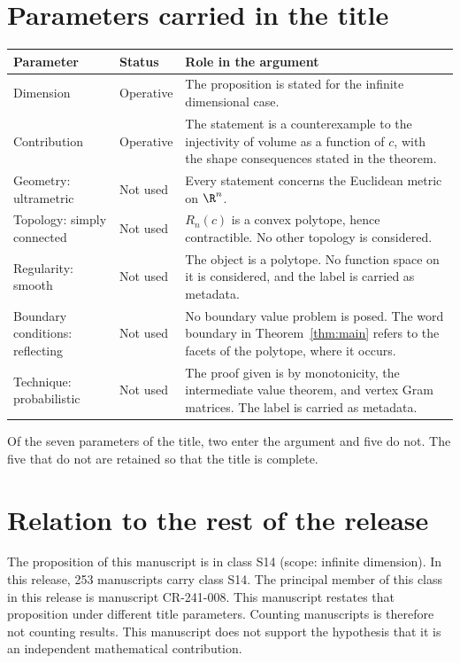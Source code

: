 \documentclass[11pt]{article}
\begin{document}
\section{Parameters carried in the title}\label{sec:params}
\begin{center}
\small
\begin{tabular}{p{}p{}p{}}
\toprule
Parameter & Status & Role in the argument \\
\midrule
Dimension & Operative & The proposition is stated for the infinite dimensional case. \\
Contribution & Operative & The statement is a counterexample to the injectivity of volume as a function of $c$, with the shape consequences stated in the theorem. \\
Geometry: ultrametric & Not used & Every statement concerns the Euclidean metric on $\R^n$. \\
Topology: simply connected & Not used & $R_n(c)$ is a convex polytope, hence contractible. No other topology is considered. \\
Regularity: smooth & Not used & The object is a polytope. No function space on it is considered, and the label is carried as metadata. \\
Boundary conditions: reflecting & Not used & No boundary value problem is posed. The word boundary in Theorem~\ref{thm:main} refers to the facets of the polytope, where it occurs. \\
Technique: probabilistic & Not used & The proof given is by monotonicity, the intermediate value theorem, and vertex Gram matrices. The label is carried as metadata. \\
\bottomrule
\end{tabular}
\end{center}
Of the seven parameters of the title, two enter the argument and five do not. The five that do not are retained so that the title is complete.

\section{Relation to the rest of the release}
The proposition of this manuscript is in class S14 (scope: infinite dimension).
In this release, 253 manuscripts carry class S14. The principal member of this class in this release is manuscript CR-241-008. This manuscript restates that proposition under different title parameters.
Counting manuscripts is therefore not counting results. This manuscript does not support the hypothesis that it is an independent mathematical contribution.
\end{document}
